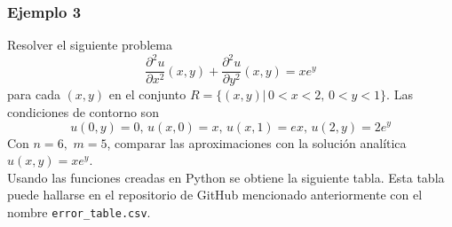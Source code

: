 \documentclass[a4paper]{article}
\begin{document}
\subsubsection{Ejemplo 3}
Resolver el siguiente problema 
\begin{equation}
\frac{\partial^2 u}{\partial x^2}(x,y)+\frac{\partial^2 u}{\partial y^2}(x,y)=x e^{y}
\end{equation}
para cada $(x,y)$ en el conjunto $R=\{ (x,y)|\, 0<x<2,\, 0<y<1 \}$. Las condiciones de contorno  son 
\begin{equation*}
u(0,y)=0,\,u(x,0)=x,\, u(x,1)=ex,\, u(2,y)=2e^y
\end{equation*}
Con $n=6,\,\,m=5$, comparar las aproximaciones con la solución analítica $u(x,y)=x e^y$.\\
Usando las funciones creadas en Python se obtiene la siguiente tabla. Esta tabla puede hallarse en el repositorio de GitHub mencionado anteriormente con el nombre \texttt{error\_table.csv}.\\
\end{document}
